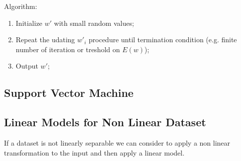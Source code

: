 Algorithm:

\begin{enumerate}
    \item Initialize $w'$ with small random values;
    \item Repeat the udating $w'_i$ procedure until termination condition (e.g. finite number of iteration or treshold on $E(w)$);
    \item Output $w'$;
\end{enumerate}

\subsection{Support Vector Machine}

\subsection{Linear Models for Non Linear Dataset}

If a dataset is not linearly separable we can consider to apply a non linear transformation to the input and then apply a linear model.
